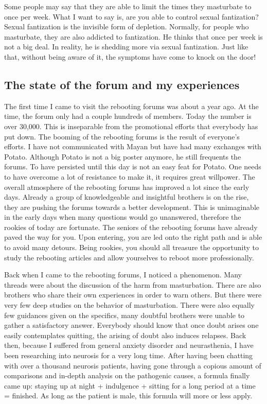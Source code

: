 \documentclass[
]{book}
\begin{document}
Some people may say that they are able to limit the times they masturbate to once per week. What I want to say is, are you able to control sexual fantization? Sexual fantization is the invisible form of depletion. Normally, for people who masturbate, they are also addicted to fantization. He thinks that once per week is not a big deal. In reality, he is shedding more via sexual fantization. Just like that, without being aware of it, the symptoms have come to knock on the door!

\hypertarget{the-state-of-the-forum-and-my-experiences}{%
\subsection{The state of the forum and my experiences}\label{the-state-of-the-forum-and-my-experiences}}

The first time I came to visit the rebooting forums was about a year ago. At the time, the forum only had a couple hundreds of members. Today the number is over 30,000. This is inseparable from the promotional efforts that everybody has put down. The booming of the rebooting forums is the result of everyone's efforts. I have not communicated with Mayan but have had many exchanges with Potato. Although Potato is not a big poster anymore, he still frequents the forums. To have persisted until this day is not an easy feat for Potato. One needs to have overcome a lot of resistance to make it, it requires great willpower. The overall atmosphere of the rebooting forums has improved a lot since the early days. Already a group of knowledgeable and insightful brothers is on the rise, they are pushing the forums towards a better development. This is unimaginable in the early days when many questions would go unanswered, therefore the rookies of today are fortunate. The seniors of the rebooting forums have already paved the way for you. Upon entering, you are led onto the right path and is able to avoid many detours. Being rookies, you should all treasure the opportunity to study the rebooting articles and allow yourselves to reboot more professionally.

Back when I came to the rebooting forums, I noticed a phenomenon. Many threads were about the discussion of the harm from masturbation. There are also brothers who share their own experiences in order to warn others. But there were very few deep studies on the behavior of masturbation. There were also equally few guidances given on the specifics, many doubtful brothers were unable to gather a satisfactory answer. Everybody should know that once doubt arises one easily contemplates quitting, the arising of doubt also induces relapses. Back then, because I suffered from general anxiety disorder and neurasthenia, I have been researching into neurosis for a very long time. After having been chatting with over a thousand neurosis patients, having gone through a copious amount of comparisons and in-depth analysis on the pathogenic causes, a formula finally came up: staying up at night + indulgence + sitting for a long period at a time = finished. As long as the patient is male, this formula will more or less apply.
\end{document}
